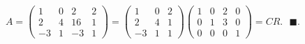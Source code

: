 \documentclass[11pt,letterpaper]{article}
\newcommand{\finf}{\blacksquare.}
\begin{document}
\begin{enumerate}
\begin{align*}
A=\begin{pmatrix}
 1 & 0 & 2 & 2\\
 2 & 4 &16 & 1\\
-3 & 1 &-3 & 1
\end{pmatrix}=\begin{pmatrix}
 1 & 0 & 2\\
 2 & 4 & 1\\
-3 & 1 & 1
\end{pmatrix}\begin{pmatrix}
 1 & 0 & 2 & 0\\
 0 & 1 & 3 & 0\\
 0 & 0 & 0 & 1
\end{pmatrix}=CR.\ \ \ \finf
\end{align*}

\end{enumerate}
\end{document}
